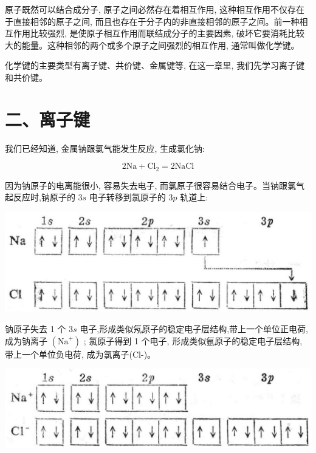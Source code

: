 \documentclass[10pt]{article}
\begin{document}
原子既然可以结合成分子, 原子之间必然存在着相互作用, 这种相互作用不仅存在于直接相邻的原子之间, 而且也存在于分子内的非直接相邻的原子之间。前一种相互作用比较强烈, 是使原子相互作用而联结成分子的主要因素, 破坏它要消耗比较大的能量。这种相邻的两个或多个原子之间强烈的相互作用, 通常叫做化学键。

化学键的主要类型有离子键、共价键、金属键等, 在这一章里, 我们先学习离子键和共价键。

\section*{二、离子键}

我们已经知道, 金属钠跟氯气能发生反应, 生成氯化钠:

\[
2\mathrm{{Na}} + {\mathrm{{Cl}}}_{2} = 2\mathrm{{NaCl}}
\]

因为钠原子的电离能很小, 容易失去电子, 而氯原子很容易结合电子。当钠跟氯气起反应时,钠原子的 \({3s}\) 电子转移到氯原子的 \({3p}\) 轨道上:

\begin{center}
\includegraphics[max width=1.0\textwidth]{images/01912d13-9986-7822-a012-3f3f7be99dcb_7_558894.jpg}
\end{center}

钠原子失去 1 个 \({3s}\) 电子,形成类似氖原子的稳定电子层结构,带上一个单位正电荷,成为钠离子 \(\left( {\mathrm{{Na}}}^{ + }\right)\) ; 氯原子得到 1 个电子, 形成类似氩原子的稳定电子层结构, 带上一个单位负电荷, 成为氯离子(Cl-)。

\begin{center}
\includegraphics[max width=1.0\textwidth]{images/01912d13-9986-7822-a012-3f3f7be99dcb_7_866768.jpg}
\end{center}
\end{document}
